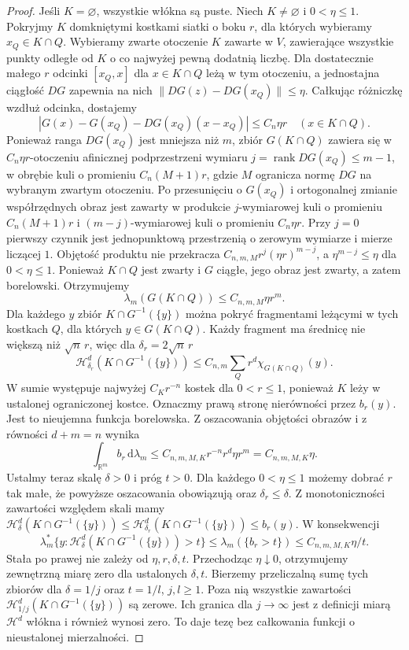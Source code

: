 \begin{proof}
Jeśli $K=\varnothing$, wszystkie włókna są puste.
Niech $K\ne\varnothing$ i $0<\eta\le1$.
Pokryjmy $K$ domkniętymi kostkami siatki
o boku $r$, dla których wybieramy $x_Q\in K\cap Q$.
Wybieramy zwarte otoczenie $K$ zawarte w $V$,
zawierające wszystkie punkty odległe od $K$
o co najwyżej pewną dodatnią liczbę.
Dla dostatecznie małego $r$ odcinki $[x_Q,x]$
dla $x\in K\cap Q$ leżą w tym otoczeniu,
a jednostajna ciągłość $DG$ zapewnia na nich
$\|DG(z)-DG(x_Q)\|\le\eta$.
Całkując różniczkę wzdłuż odcinka, dostajemy
\[
 |G(x)-G(x_Q)-DG(x_Q)(x-x_Q)|\le C_n\eta r
 \quad(x\in K\cap Q).
\]
Ponieważ ranga $DG(x_Q)$ jest mniejsza niż $m$,
zbiór $G(K\cap Q)$ zawiera się w
$C_n\eta r$-otoczeniu afinicznej podprzestrzeni
wymiaru $j=\operatorname{rank}DG(x_Q)\le m-1$,
w obrębie kuli o promieniu $C_n(M+1)r$, gdzie
$M$ ogranicza normę $DG$ na wybranym zwartym otoczeniu.
Po przesunięciu o $G(x_Q)$ i ortogonalnej zmianie
współrzędnych obraz jest zawarty w produkcie
$j$-wymiarowej kuli o promieniu $C_n(M+1)r$
i $(m-j)$-wymiarowej kuli o promieniu $C_n\eta r$.
Przy $j=0$ pierwszy czynnik jest jednopunktową
przestrzenią o zerowym wymiarze i mierze liczącej $1$.
Objętość produktu nie przekracza
$C_{n,m,M}r^j(\eta r)^{m-j}$, a
$\eta^{m-j}\le\eta$ dla $0<\eta\le1$.
Ponieważ $K\cap Q$ jest zwarty i $G$ ciągłe,
jego obraz jest zwarty, a zatem borelowski. Otrzymujemy
\[
 \lambda_m(G(K\cap Q))\le C_{n,m,M}\eta r^m.
\]
Dla każdego $y$ zbiór $K\cap G^{-1}(\{y\})$
można pokryć fragmentami leżącymi w tych
kostkach $Q$, dla których $y\in G(K\cap Q)$.
Każdy fragment ma średnicę nie większą niż
$\sqrt n\,r$, więc dla $\delta_r=2\sqrt n\,r$
\[
 \mathcal H^d_{\delta_r}(K\cap G^{-1}(\{y\}))
 \le C_{n,m}\sum_Q r^d\chi_{G(K\cap Q)}(y).
\]
W sumie występuje najwyżej $C_K r^{-n}$ kostek
dla $0<r\le1$, ponieważ $K$ leży w ustalonej
ograniczonej kostce. Oznaczmy prawą stronę
nierówności przez $b_r(y)$. Jest to nieujemna
funkcja borelowska. Z oszacowania objętości
obrazów i z równości $d+m=n$ wynika
\[
 \int_{\mathbb R^m}b_r\,\mathrm d\lambda_m
 \le C_{n,m,M,K}r^{-n}r^d\eta r^m
 =C_{n,m,M,K}\eta.
\]
Ustalmy teraz skalę $\delta>0$ i próg $t>0$.
Dla każdego $0<\eta\le1$ możemy dobrać $r$
tak małe, że powyższe oszacowania obowiązują
oraz $\delta_r\le\delta$.
Z monotoniczności zawartości względem skali mamy
$\mathcal H^d_\delta(K\cap G^{-1}(\{y\}))
\le\mathcal H^d_{\delta_r}(K\cap G^{-1}(\{y\}))
\le b_r(y)$.
W konsekwencji
\[
 \lambda_m^*\{y:\mathcal H^d_\delta
 (K\cap G^{-1}(\{y\}))>t\}
 \le\lambda_m(\{b_r>t\})
 \le C_{n,m,M,K}\eta/t.
\]
Stała po prawej nie zależy od $\eta,r,\delta,t$.
Przechodząc $\eta\downarrow0$, otrzymujemy
zewnętrzną miarę zero dla ustalonych $\delta,t$.
Bierzemy przeliczalną sumę tych zbiorów dla
$\delta=1/j$ oraz $t=1/l$, $j,l\ge1$.
Poza nią wszystkie zawartości
$\mathcal H^d_{1/j}(K\cap G^{-1}(\{y\}))$ są zerowe.
Ich granica dla $j\to\infty$ jest z definicji
miarą $\mathcal H^d$ włókna i również wynosi zero.
To daje tezę bez całkowania funkcji o nieustalonej
mierzalności.
\end{proof}



